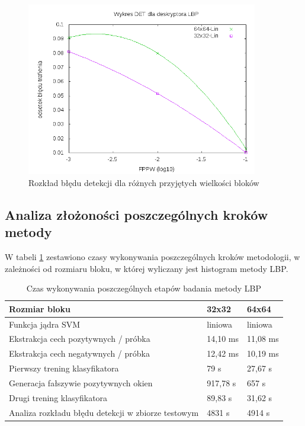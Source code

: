 \begin{figure}[htb]
\centering
\includegraphics[width=0.9\textwidth]{lbp_det.png}
\caption{Rozkład błędu detekcji dla różnych przyjętych wielkości bloków}
\label{fig:lbp_det}
\end{figure}

\subsection{Analiza złożoności poszczególnych kroków metody}

W tabeli \ref{tab:lbp_times} zestawiono czasy wykonywania poszczególnych kroków metodologii, w zależności od rozmiaru bloku, w której wyliczany jest histogram metody LBP.

\begin{center}
    \begin{longtable}{ | p{5cm} | p{3cm} | p{3cm}|}
     \caption{Czas wykonywania poszczególnych etapów badania metody LBP} 
     \label{tab:lbp_times}\\
    \hline
	Rozmiar bloku & 32x32 & 64x64 \\ \hline
	Funkcja jądra SVM & liniowa & liniowa  \\ \hline
    Ekstrakcja cech pozytywnych / próbka & 14,10 ms & 11,08 ms \\ \hline
    Ekstrakcja cech negatywnych / próbka & 12,42 ms & 10,19 ms \\ \hline
    Pierwszy trening klasyfikatora & 79 s & 27,67 s \\ \hline
    Generacja fałszywie pozytywnych okien & 917,78 s & 657 s \\ \hline
    Drugi trening klasyfikatora & 89,83 s & 31,62 s \\ \hline
    Analiza rozkładu błędu detekcji w zbiorze testowym & 4831 s & 4914 s \\ \hline
    \end{longtable}
\end{center}


